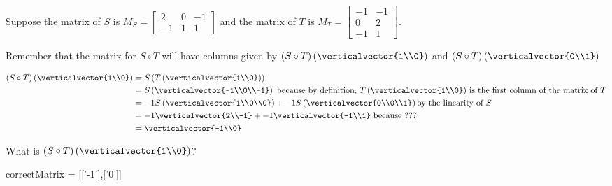 \documentclass{ximera}
\begin{document}
\begin{question}
  Suppose the matrix of $S$ is $M_S = \begin{bmatrix}
2 & 0 & -1 \\
-1 & 1 & 1
\end{bmatrix}$ and the matrix of $T$ is $M_T = \begin{bmatrix}
-1 & -1 \\
0 & 2 \\
-1 & 1
\end{bmatrix}$.

\begin{solution}
\begin{hint}
	Remember that the matrix for $S \circ T$ will have columns given by $(S \circ T)\left(\verticalvector{1\\0}\right)$ and $(S \circ T)\left(\verticalvector{0\\1}\right)$
\end{hint}
\begin{hint}
	\begin{question}
		\begin{solution}
		\begin{hint}
			\begin{align*}
				(S \circ T)\left(\verticalvector{1\\0}\right) &= S\left(T\left(\verticalvector{1\\0}\right)\right)\\
				&= S\left(\verticalvector{-1\\0\\-1}\right) \text{ because by definition, $T\left(\verticalvector{1\\0}\right)$ is the first column of the matrix of $T$}\\
				&=-1S\left(\verticalvector{1\\0\\0}\right) +-1 S\left(\verticalvector{0\\0\\1}\right) \text{by the linearity of $S$}\\
				&=-1\verticalvector{2\\-1}+-1\verticalvector{-1\\1} \text{ because ???}\\
				&=\verticalvector{-1\\0}
			\end{align*}
		\end{hint}
		What is  $(S \circ T)\left(\verticalvector{1\\0}\right)$?
			\begin{matrix-answer}[name=M]
 			   correctMatrix = [['-1'],['0']]
 			 \end{matrix-answer}
		\end{solution}
		

\end{question}
\end{hint}
\end{solution}
\end{question}
\end{document}

